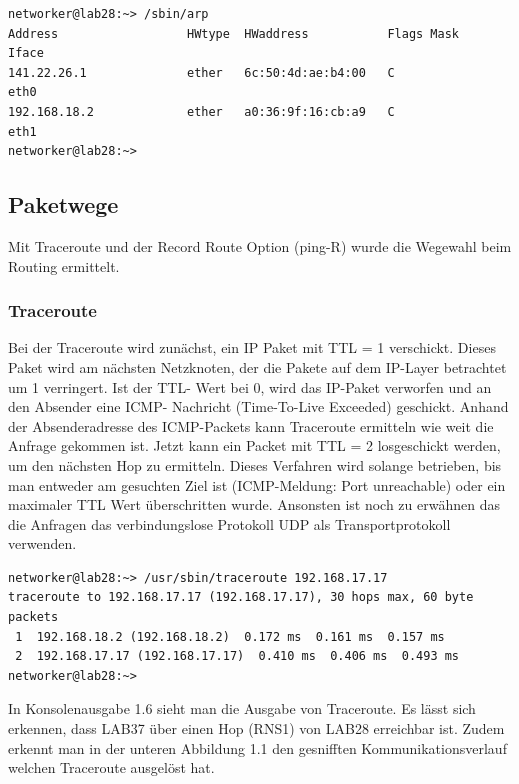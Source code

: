\begin{lstlisting}[label=arbknoten,caption=ARP Request und Replay zwischen RNS1 und LAB28]
networker@lab28:~> /sbin/arp
Address                  HWtype  HWaddress           Flags Mask            Iface
141.22.26.1              ether   6c:50:4d:ae:b4:00   C                     eth0
192.168.18.2             ether   a0:36:9f:16:cb:a9   C                     eth1
networker@lab28:~> 
\end{lstlisting}
\subsection{Paketwege}
Mit Traceroute und der Record Route Option (ping-R) wurde die Wegewahl beim Routing ermittelt.
\subsubsection{Traceroute}
Bei der Traceroute wird zunächst, ein IP Paket mit TTL = 1 verschickt. Dieses Paket wird am nächsten Netzknoten, der die Pakete auf dem IP-Layer betrachtet um 1 verringert. Ist der TTL- Wert bei 0, wird das IP-Paket verworfen und an den Absender eine ICMP- Nachricht (Time-To-Live Exceeded) geschickt. Anhand der Absenderadresse des ICMP-Packets kann Traceroute ermitteln wie weit die Anfrage gekommen ist. Jetzt kann ein Packet mit TTL = 2 losgeschickt werden, um den nächsten Hop zu ermitteln. Dieses Verfahren wird solange betrieben, bis man entweder am gesuchten Ziel ist (ICMP-Meldung: Port unreachable) oder ein maximaler TTL Wert überschritten wurde. Ansonsten ist noch zu erwähnen das die Anfragen das verbindungslose Protokoll UDP als Transportprotokoll verwenden.
\begin{lstlisting}[label=traceknoten,caption=Traceroute Ausgabe]
networker@lab28:~> /usr/sbin/traceroute 192.168.17.17
traceroute to 192.168.17.17 (192.168.17.17), 30 hops max, 60 byte packets
 1  192.168.18.2 (192.168.18.2)  0.172 ms  0.161 ms  0.157 ms
 2  192.168.17.17 (192.168.17.17)  0.410 ms  0.406 ms  0.493 ms
networker@lab28:~>
\end{lstlisting}
In Konsolenausgabe 1.6 sieht man die Ausgabe von Traceroute. Es lässt sich erkennen, dass LAB37 über einen Hop (RNS1) von LAB28 erreichbar ist. Zudem erkennt man in der unteren Abbildung 1.1 den gesnifften Kommunikationsverlauf welchen Traceroute ausgelöst hat.

